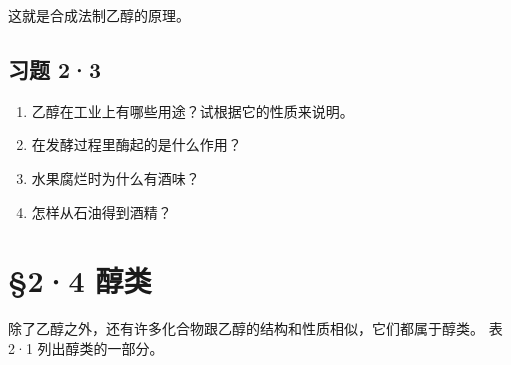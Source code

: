 这就是合成法制乙醇的原理。

\subsection{习题 2·3}

\begin{enumerate}
\item
  乙醇在工业上有哪些用途？试根据它的性质来说明。
\item
  在发酵过程里酶起的是什么作用？
\item
  水果腐烂时为什么有酒味？
\item
  怎样从石油得到酒精？
\end{enumerate}

\section{§2·4 醇类}

除了乙醇之外，还有许多化合物跟乙醇的结构和性质相似，它们都属于醇类。 表
2·1 列出醇类的一部分。

